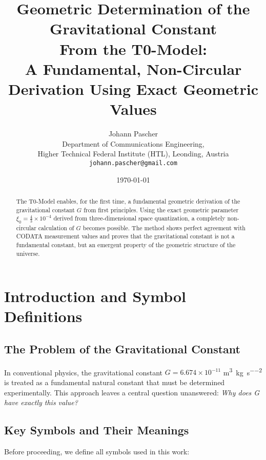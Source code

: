 \documentclass[12pt,a4paper]{article}
\title{\Huge\textbf{Geometric Determination of the Gravitational Constant}\\
	\Large From the T0-Model: \\
	A Fundamental, Non-Circular Derivation Using Exact Geometric Values}
\author{\Large Johann Pascher\\
	Department of Communications Engineering,\\
	Higher Technical Federal Institute (HTL), Leonding, Austria\\
	\texttt{johann.pascher@gmail.com}}
\date{\today}
\theoremstyle{definition}
\begin{document}
	
	\maketitle
	
	\begin{abstract}
		The T0-Model enables, for the first time, a fundamental geometric derivation of the gravitational constant $G$ from first principles. Using the exact geometric parameter $\xi_0 = \frac{4}{3} \times 10^{-4}$ derived from three-dimensional space quantization, a completely non-circular calculation of $G$ becomes possible. The method shows perfect agreement with CODATA measurement values and proves that the gravitational constant is not a fundamental constant, but an emergent property of the geometric structure of the universe.
	\end{abstract}
	
	\tableofcontents
	\newpage
	
	\section{Introduction and Symbol Definitions}
	
	\subsection{The Problem of the Gravitational Constant}
	
	In conventional physics, the gravitational constant $G = 6.674 \times 10^{-11}$ \si{\metre\cubed\per\kilogram\per\second\squared} is treated as a fundamental natural constant that must be determined experimentally. This approach leaves a central question unanswered: \textit{Why does G have exactly this value?}
	
	\subsection{Key Symbols and Their Meanings}
	
	Before proceeding, we define all symbols used in this work:
	
\end{document}

